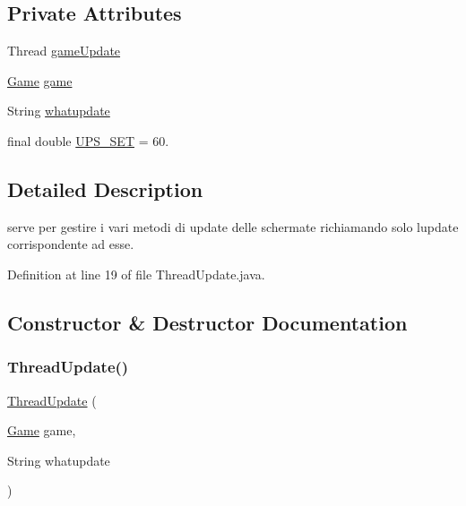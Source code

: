 \subsection*{Private Attributes}
\begin{DoxyCompactItemize}
\item 
Thread \hyperlink{classprogetto_1_1_thread_update_a4e175e62806a83107a8a9252b46ca063}{game\+Update}
\item 
\hyperlink{classprogetto_1_1_game}{Game} \hyperlink{classprogetto_1_1_thread_update_ac6a5ed6191fcf3a5bf0445921feb4f48}{game}
\item 
String \hyperlink{classprogetto_1_1_thread_update_ae70dd66bad208f0448dbc65cb7d7035f}{whatupdate}
\item 
final double \hyperlink{classprogetto_1_1_thread_update_af855ab43da6a4e5b569907fca1d1e144}{U\+P\+S\+\_\+\+S\+ET} = 60.
\end{DoxyCompactItemize}


\subsection{Detailed Description}
serve per gestire i vari metodi di update delle schermate richiamando solo l\textquotesingle{}update corrispondente ad esse. 

Definition at line 19 of file Thread\+Update.\+java.



\subsection{Constructor \& Destructor Documentation}
\mbox{\label{classprogetto_1_1_thread_update_a1e13ad42d90d11ba28b7f2cb38d6dc53}} 
\subsubsection{\texorpdfstring{Thread\+Update()}{ThreadUpdate()}}
{\footnotesize\ttfamily \hyperlink{classprogetto_1_1_thread_update}{Thread\+Update} (\begin{DoxyParamCaption}\item[{\hyperlink{classprogetto_1_1_game}{Game}}]{game,  }\item[{String}]{whatupdate }\end{DoxyParamCaption})}



